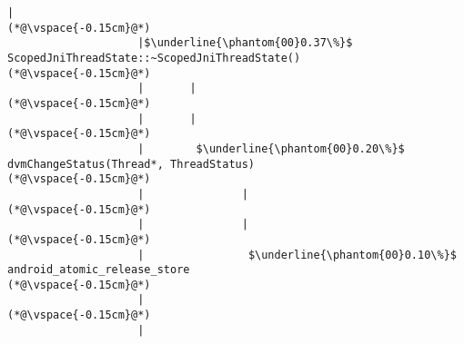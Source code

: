 \begin{lstlisting}[caption=20 viiteparametria (C$\to$Java) , label=profile:C2JBenchmark00206, numberbychapter=true, frame=lines]
                    |
(*@\vspace{-0.15cm}@*)
                    |$\underline{\phantom{00}0.37\%}$ ScopedJniThreadState::~ScopedJniThreadState()
(*@\vspace{-0.15cm}@*)
                    |       |
(*@\vspace{-0.15cm}@*)
                    |       |
(*@\vspace{-0.15cm}@*)
                    |        $\underline{\phantom{00}0.20\%}$ dvmChangeStatus(Thread*, ThreadStatus)
(*@\vspace{-0.15cm}@*)
                    |               |
(*@\vspace{-0.15cm}@*)
                    |               |
(*@\vspace{-0.15cm}@*)
                    |                $\underline{\phantom{00}0.10\%}$ android_atomic_release_store
(*@\vspace{-0.15cm}@*)
                    |
(*@\vspace{-0.15cm}@*)
                    |



\end{lstlisting}

